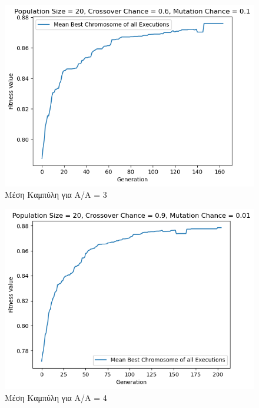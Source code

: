 \documentclass[12pt,a4paper]{article}
\begin{document}
\begin{figure}[H]
	\includegraphics[width=\textwidth]{Figures/5. Means for AA = 3.png}
	\caption{Μέση Καμπύλη για A/A = 3}
\end{figure}

\begin{figure}[H]
	\includegraphics[width=\textwidth]{Figures/7. Means for AA = 4.png}
	\caption{Μέση Καμπύλη για A/A = 4}
\end{figure}
\end{document}
